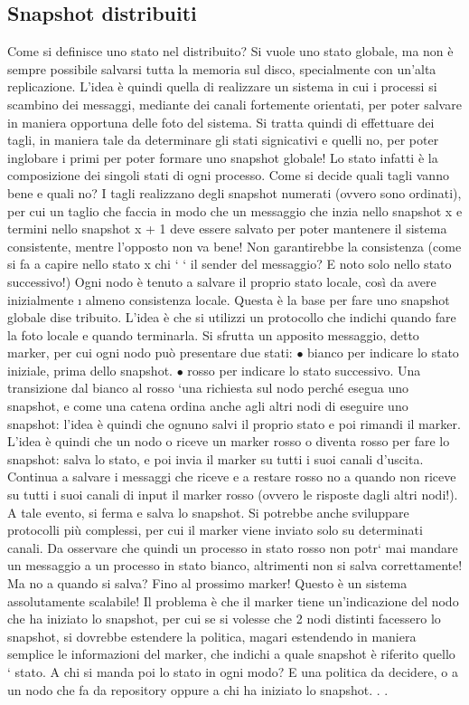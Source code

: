 \subsection{Snapshot distribuiti}
Come si definisce uno stato nel distribuito? Si vuole uno stato globale, ma
non è sempre possibile salvarsi tutta la memoria sul disco, specialmente con
un'alta replicazione. L'idea è quindi quella di realizzare un sistema in cui i
processi si scambino dei messaggi, mediante dei canali fortemente orientati, per
poter salvare in maniera opportuna delle foto del sistema. Si tratta quindi di
effettuare dei tagli, in maniera tale da determinare gli stati signicativi e quelli
no, per poter inglobare i primi per poter formare uno snapshot globale! Lo stato
infatti è la composizione dei singoli stati di ogni processo.
Come si decide quali tagli vanno bene e quali no? I tagli realizzano degli
snapshot numerati (ovvero sono ordinati), per cui un taglio che faccia in modo
che un messaggio che inzia nello snapshot x e termini nello snapshot x + 1 deve
essere salvato per poter mantenere il sistema consistente, mentre l'opposto non
va bene! Non garantirebbe la consistenza (come si fa a capire nello stato x chi
`
` il sender del messaggio? E noto solo nello stato successivo!)
Ogni nodo è tenuto a salvare il proprio stato locale, così da avere inizialmente
\i{}
almeno consistenza locale. Questa è la base per fare uno snapshot globale dise
tribuito. L'idea è che si utilizzi un protocollo che indichi quando fare la foto
locale e quando terminarla. Si sfrutta un apposito messaggio, detto marker, per
cui ogni nodo può presentare due stati:
$\bullet$ bianco per indicare lo stato iniziale, prima dello snapshot.
$\bullet$ rosso per indicare lo stato successivo.
Una transizione dal bianco al rosso `una richiesta sul nodo perché esegua uno
snapshot, e come una catena ordina anche agli altri nodi di eseguire uno snapshot: l'idea è quindi che ognuno salvi il
proprio stato e poi rimandi il marker.
L'idea è quindi che un nodo o riceve un marker rosso o diventa rosso per
fare lo snapshot: salva lo stato, e poi invia il marker su tutti i suoi canali
d'uscita. Continua a salvare i messaggi che riceve e a restare rosso no a quando
non riceve su tutti i suoi canali di input il marker rosso (ovvero le risposte
dagli altri nodi!). A tale evento, si ferma e salva lo snapshot. Si potrebbe
anche sviluppare protocolli più complessi, per cui il marker viene inviato solo
su determinati canali. Da osservare che quindi un processo in stato rosso non
potr` mai mandare un messaggio a un processo in stato bianco, altrimenti non
si salva correttamente!
Ma no a quando si salva? Fino al prossimo marker! Questo è un sistema
assolutamente scalabile! Il problema è che il marker tiene un'indicazione del
nodo che ha iniziato lo snapshot, per cui se si volesse che 2 nodi distinti facessero
lo snapshot, si dovrebbe estendere la politica, magari estendendo in maniera
semplice le informazioni del marker, che indichi a quale snapshot è riferito quello
`
stato. A chi si manda poi lo stato in ogni modo? E una politica da decidere, o
a un nodo che fa da repository oppure a chi ha iniziato lo snapshot. . .